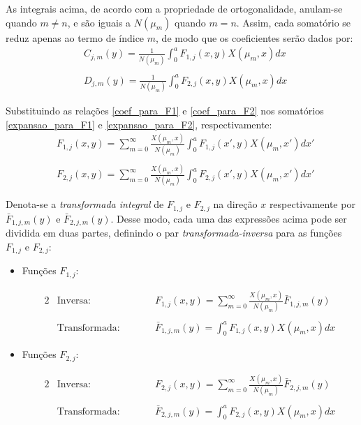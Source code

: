 As integrais acima, de acordo com a propriedade de ortogonalidade, anulam-se quando $m \ne n$, e são iguais a $N(\mu_m)$ quando $m = n$. Assim, cada somatório se reduz apenas ao
termo de índice $m$, de modo que os coeficientes serão dados por:
\begin{align}
	& C_{j,m}(y) = \frac{1}{N(\mu_m)}\int_0^a F_{1, j}(x, y)X(\mu_m, x)dx \label{coef_para_F1}\\ \nonumber \\
	& D_{j,m}(y) = \frac{1}{N(\mu_m)}\int_0^a F_{2, j}(x, y)X(\mu_m, x)dx \label{coef_para_F2}
\end{align}

Substituindo as relações \eqref{coef_para_F1} e \eqref{coef_para_F2} nos somatórios \eqref{expansao_para_F1} e \eqref{expansao_para_F2}, respectivamente:
\begin{align}
	& F_{1, j}(x, y) = \sum_{m=0}^\infty \frac{X(\mu_m, x)}{N(\mu_m)}\int_0^a F_{1, j}(x', y)X(\mu_m, x')dx' \label{expansao_para_F1_nova}\\ \nonumber \\
	& F_{2, j}(x, y) = \sum_{m=0}^\infty \frac{X(\mu_m, x)}{N(\mu_m)}\int_0^a F_{2, j}(x', y)X(\mu_m, x')dx' \label{expansao_para_F2_nova}
\end{align}

Denota-se a \textit{transformada integral} de $F_{1, j}$ e $F_{2, j}$ na direção $x$ respectivamente por $\bar{F}_{1,j,m}(y)$ e $\bar{F}_{2,j,m}(y)$.
Desse modo, cada uma das expressões acima pode ser dividida em duas partes, definindo o par \textit{transformada-inversa} para as funções $F_{1,j}$ e $F_{2,j}$:
\begin{itemize}
  \item Funções $F_{1, j}$:
  \begin{fleqn}
  \begin{alignat}{2}
  		& \text{Inversa:} && F_{1, j}(x, y) = \sum_{m=0}^\infty \frac{X(\mu_m, x)}{N(\mu_m)}\bar{F}_{1,j,m}(y) \label{definicao_da_transf_inv_F1} \\ \nonumber \\
  		& \text{Transformada:} \quad\quad && \bar{F}_{1,j,m}(y) = \int_0^a F_{1, j}(x, y) X(\mu_m, x) dx \label{definicao_da_transf_F1}
  \end{alignat}
  \end{fleqn}
  \item Funções $F_{2, j}$:
  \begin{fleqn}
  \begin{alignat}{2}
  		& \text{Inversa:} && F_{2, j}(x, y) = \sum_{m=0}^\infty \frac{X(\mu_m, x)}{N(\mu_m)}\bar{F}_{2,j,m}(y) \label{definicao_da_transf_inv_F2} \\ \nonumber \\
  		& \text{Transformada:} \quad\quad && \bar{F}_{2,j,m}(y) = \int_0^a F_{2, j}(x, y) X(\mu_m, x) dx
  		\label{definicao_da_transf_F2}
  \end{alignat}
  \end{fleqn}
\end{itemize}


